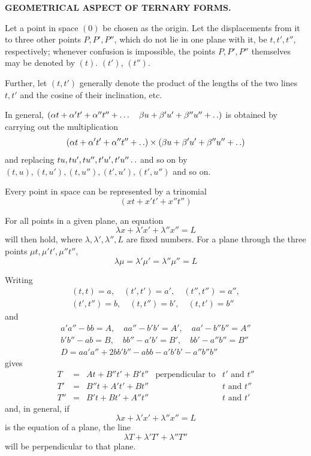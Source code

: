 \clearpage
\renewcommand{\BookRunningTitle}{Geometrical Aspect of Ternary Forms}
\begin{center}\Large\bfseries GEOMETRICAL ASPECT OF TERNARY FORMS.\end{center}
\BookRule{30mm}

Let a point in space $(0)$ be chosen as the origin. Let the displacements from it to three other points $P,P',P''$, which do not lie in one plane with it, be $t,t',t''$, respectively; whenever confusion is impossible, the points $P,P',P''$ themselves may be denoted by $(t)$. $(t')$, $(t'')$.

Further, let $(t,t')$ generally denote the product of the lengths of the two lines $t,t'$ and the cosine of their inclination, etc.

In general, $(\alpha t+\alpha't'+\alpha''t''+\ldots\quad\beta u+\beta'u'+\beta''u''+\mathinner{.\,.})$ is obtained by carrying out the multiplication
\[
(\alpha t+\alpha't'+\alpha''t''+\mathinner{.\,.})\times(\beta u+\beta'u'+\beta''u''+\mathinner{.\,.})
\]
and replacing $tu,\allowbreak tu',\allowbreak tu'',\allowbreak t'u',\allowbreak t'u''\mathinner{.\,.}$ and so on by $(t,u),\allowbreak(t,u'),\allowbreak(t,u''),\allowbreak(t',u'),\allowbreak(t',u'')$ and so on.

Every point in space can be represented by a trinomial
\[
(xt+x't'+x''t'')
\]

For all points in a given plane, an equation
\[
\lambda x+\lambda'x'+\lambda''x''=L
\]
will then hold, where $\lambda,\lambda',\lambda'',L$ are fixed numbers. For a plane through the three points $\mu t,\mu't',\mu''t''$,
\[
\lambda\mu=\lambda'\mu'=\lambda''\mu''=L
\]

Writing
\[
\begin{gathered}
(t,t)=a,\quad(t',t')=a',\quad(t'',t'')=a'',\\
(t',t'')=b,\quad(t,t'')=b',\quad(t,t')=b''
\end{gathered}
\]
and
\[
\begin{gathered}
a'a''-bb=A,\quad aa''-b'b'=A',\quad aa'-b''b''=A''\\
b'b''-ab=B,\quad bb''-a'b'=B',\quad bb'-a''b''=B''\\
D=aa'a''+2bb'b''-abb-a'b'b'-a''b''b''
\end{gathered}
\]
gives
\[
\begin{array}{rclll}
T&=&At+B''t'+B't''&\text{perpendicular to}&t'\text{ and }t''\\
T'&=&B''t+A't'+Bt''&&t\text{ and }t''\\
T''&=&B't+Bt'+A''t''&&t\text{ and }t'
\end{array}
\]
and, in general, if
\begingroup{}
\[
\lambda x+\lambda'x'+\lambda''x''=L
\]\endgroup
is the equation of a plane, the line
\[
\lambda T+\lambda'T'+\lambda''T''
\]
will be perpendicular to that plane.

